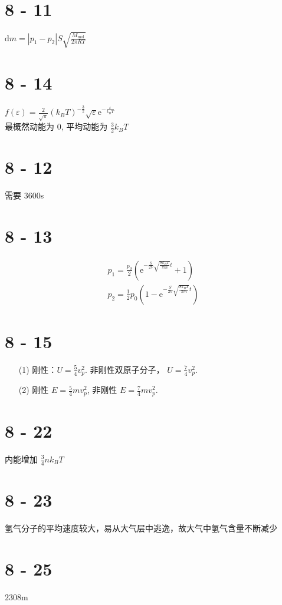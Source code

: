 \documentclass{article}
\newcommand{\dd}{\mathrm{d}}
\newcommand{\ee}{\mathrm{e}}
\begin{document}
\section*{8 - 11}

$\dd m = \left\lvert p_1 - p_2\right\rvert S\sqrt{\frac{M_{\mathrm{mol}}}{2\pi RT}}$

\section*{8 - 14}

$f(\varepsilon) = \frac{2}{\sqrt{\pi}}\left(k_BT\right)^{-\frac{3}{2}}\sqrt{\varepsilon}\ee^{-\frac{\varepsilon}{k_BT}}$ \\
最概然动能为 $0$, 平均动能为 $\frac{3}{2}k_BT$

\section*{8 - 12}

需要 $3600$s

\section*{8 - 13}

\begin{align*}
    p_1 = \frac{p_0}{2}\left(\ee^{-\frac{S}{2V}\sqrt{\frac{8k_BT}{\pi m}}t} + 1\right) \\
    p_2 = \frac{1}{2}p_0\left(1 - \ee^{-\frac{S}{2V}\sqrt{\frac{8k_BT}{\pi m}}t}\right)
\end{align*}

\section*{8 - 15}

\begin{itemize}
    \item [(1)] 刚性：$U = \frac{5}{4}v_p^2$. 非刚性双原子分子， $U = \frac{7}{4}v_p^2$.
    \item [(2)] 刚性 $E = \frac{5}{4}mv_p^2$, 非刚性 $E = \frac{7}{4}mv_p^2$.
\end{itemize}

\section*{8 - 22}

内能增加 $\frac{3}{4}nk_BT$

\section*{8 - 23}

氢气分子的平均速度较大，易从大气层中逃逸，故大气中氢气含量不断减少

\section*{8 - 25}

$2308$m
\end{document}

